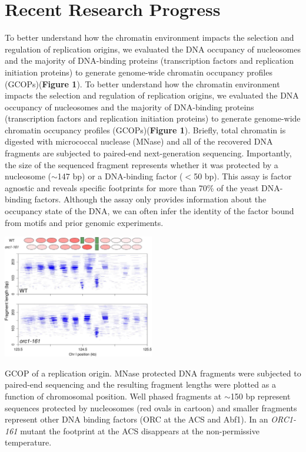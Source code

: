 \section{Recent Research Progress}
To better understand how the chromatin environment impacts the selection and regulation of replication origins, we evaluated the DNA occupancy of nucleosomes and the majority of DNA-binding proteins (\eg transcription factors and replication initiation proteins) to generate genome-wide chromatin occupancy profiles (GCOPs)({\color{dukeblue}\textbf{Figure 1}}). To better understand how the chromatin environment impacts the selection and regulation of replication origins, we evaluated the DNA occupancy of nucleosomes and the majority of DNA-binding proteins (\eg transcription factors and replication initiation proteins) to generate genome-wide chromatin occupancy profiles (GCOPs)({\color{dukeblue}\textbf{Figure 1}}). Briefly, total chromatin is digested with micrococcal nuclease (MNase) and all of the recovered DNA fragments are subjected to paired-end next-generation sequencing\citep{Belsky2015-li,Henikoff2011-vo}.  Importantly, the size of the sequenced fragment represents whether it was protected by a nucleosome ($\sim$147 bp) or a DNA-binding factor ($<$50 bp). This assay is factor agnostic and reveals specific footprints for more than 70\% of the yeast DNA-binding factors\citep{Henikoff2011-vo}.  Although the assay only provides information about the occupancy state of the DNA, we can often infer the identity of the factor bound from motifs and prior genomic experiments.   
\begin{floatingfigure}[lt]{2.6in}
\vspace{-4mm}
\begin{center}
\includegraphics[width=2.6in]{r35_figures/orc_chromatin_gcop.png}
\end{center}
\vspace{3mm}
\caption{GCOP of a replication origin.  MNase protected DNA fragments were subjected to paired-end sequencing and the resulting fragment lengths were plotted as a function of chromosomal position.  Well phased fragments at $\sim$150 bp represent sequences protected by nucleosomes (red ovals in cartoon) and smaller fragments represent other DNA binding factors (\eg ORC at the ACS and Abf1).  In an \textit{ORC1-161} mutant the footprint at the ACS disappears at the non-permissive temperature.}%
\end{floatingfigure}%
